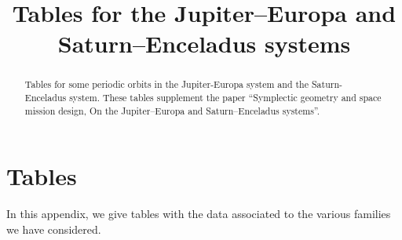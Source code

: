 \documentclass[reqno, 11pt]{amsart}
\theoremstyle{plain}
\theoremstyle{definition}
\theoremstyle{remark}
\newenvironment{nouppercase}{%
  \let\uppercase\relax%
  \renewcommand{\uppercasenonmath}[1]{}}{}
\begin{document}
\title{Tables for the Jupiter--Europa and Saturn--Enceladus systems}

\author{}





\begin{abstract}
Tables for some periodic orbits in the Jupiter-Europa system and the Saturn-Enceladus system. These tables supplement the paper ``Symplectic geometry and space mission design, On the Jupiter--Europa and Saturn--Enceladus systems''.
\end{abstract}


\begin{nouppercase}
\maketitle    
\end{nouppercase}





\section{Tables}\label{app:tables}

In this appendix, we give tables with the data associated to the various families we have considered.
\end{document}
